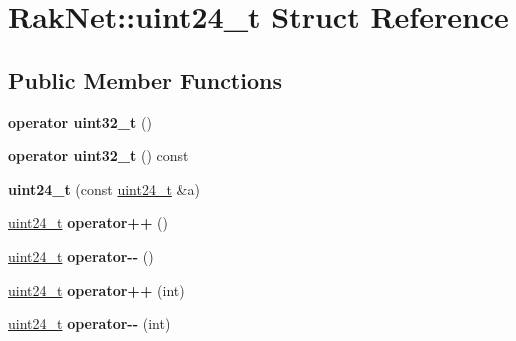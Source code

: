 \hypertarget{struct_rak_net_1_1uint24__t}{\section{Rak\-Net\-:\-:uint24\-\_\-t Struct Reference}
\label{struct_rak_net_1_1uint24__t}
}
\subsection*{Public Member Functions}
\begin{DoxyCompactItemize}
\item 
\hypertarget{struct_rak_net_1_1uint24__t_aa19a7b5a1de047ed8cb48577fd06ce59}{{\bfseries operator uint32\-\_\-t} ()}\label{struct_rak_net_1_1uint24__t_aa19a7b5a1de047ed8cb48577fd06ce59}

\item 
\hypertarget{struct_rak_net_1_1uint24__t_a64d2831850fcd5508192faa968a8a5c9}{{\bfseries operator uint32\-\_\-t} () const }\label{struct_rak_net_1_1uint24__t_a64d2831850fcd5508192faa968a8a5c9}

\item 
\hypertarget{struct_rak_net_1_1uint24__t_abde63530cf95381567ec8a12f6d08e54}{{\bfseries uint24\-\_\-t} (const \hyperlink{struct_rak_net_1_1uint24__t}{uint24\-\_\-t} \&a)}\label{struct_rak_net_1_1uint24__t_abde63530cf95381567ec8a12f6d08e54}

\item 
\hypertarget{struct_rak_net_1_1uint24__t_a2b568617b13a97e0fc0412401d4ca929}{\hyperlink{struct_rak_net_1_1uint24__t}{uint24\-\_\-t} {\bfseries operator++} ()}\label{struct_rak_net_1_1uint24__t_a2b568617b13a97e0fc0412401d4ca929}

\item 
\hypertarget{struct_rak_net_1_1uint24__t_a98eaa8bc5184b3eadf95b87c65003001}{\hyperlink{struct_rak_net_1_1uint24__t}{uint24\-\_\-t} {\bfseries operator-\/-\/} ()}\label{struct_rak_net_1_1uint24__t_a98eaa8bc5184b3eadf95b87c65003001}

\item 
\hypertarget{struct_rak_net_1_1uint24__t_ac7c6c833631be604c98afc7073630dc9}{\hyperlink{struct_rak_net_1_1uint24__t}{uint24\-\_\-t} {\bfseries operator++} (int)}\label{struct_rak_net_1_1uint24__t_ac7c6c833631be604c98afc7073630dc9}

\item 
\hypertarget{struct_rak_net_1_1uint24__t_a2b1f8566e6187a275fe4979a76fda381}{\hyperlink{struct_rak_net_1_1uint24__t}{uint24\-\_\-t} {\bfseries operator-\/-\/} (int)}\label{struct_rak_net_1_1uint24__t_a2b1f8566e6187a275fe4979a76fda381}


\end{DoxyCompactItemize}
